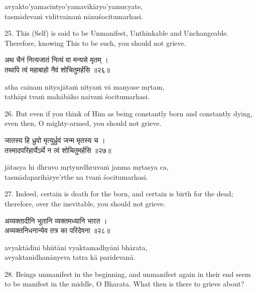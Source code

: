 \begin{transliteration}
avyakto'yamacintyo'yamavikāryo'yamucyate, \\
tasmādevaṁ viditvainaṁ nānuśocitumarhasi.
\end{transliteration}

25. This (Self) is said to be Unmanifest, Unthinkable and Unchangeable.
Therefore, knowing This to be such, you should not grieve.

\begin{gitaverse}
अथ चैनं नित्यजातं नित्यं वा मन्यसे मृतम् । \\
तथापि त्वं महाबाहो नैवं शोचितुमर्हसि ॥२६॥
\end{gitaverse}

\begin{transliteration}
atha cainam nityajātaṁ nityaṁ vā manyase mṛtam, \\
tathāpi tvaṁ mahābāho naivaṁ śocitumarhasi.
\end{transliteration}

26. But even if you think of Him as being constantly born and constantly dying,
even then, O mighty-armed, you should not grieve.

\begin{gitaverse}
जातस्य हि ध्रुवो मृत्युर्ध्रुवं जन्म मृतस्य च । \\
तस्मादपरिहार्येऽर्थे न त्वं शोचितुमर्हसि ॥२७॥
\end{gitaverse}

\begin{transliteration}
jātasya hi dhruvo mṛtyurdhruvaṁ janma mṛtasya ca, \\
tasmādaparihārye'rthe na tvaṁ śocitumarhasi.
\end{transliteration}

27. Indeed, certain is death for the born, and certain is birth for the dead;
therefore, over the inevitable, you should not grieve.

\begin{gitaverse}
अव्यक्तादीनि भूतानि व्यक्तमध्यानि भारत । \\
अव्यक्तनिधनान्येव तत्र का परिदेवना ॥२८॥
\end{gitaverse}

\begin{transliteration}
avyaktādīni bhūtāni vyaktamadhyāni bhārata, \\
avyaktanidhanānyeva tatra kā paridevanā.
\end{transliteration}

28. Beings unmanifest in the beginning, and unmanifest again in their end seem
to be manifest in the middle, O Bharata. What then is there to grieve about?

